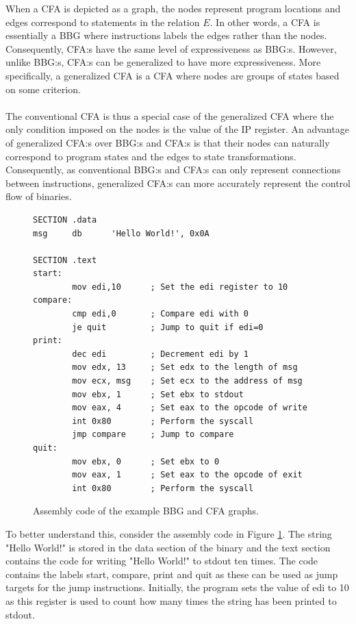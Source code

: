 \documentclass{kththesis}
\begin{document}
\clearpage
\noindent
When a CFA is depicted as a graph, the nodes represent program locations and edges correspond to statements in the relation $E$. In other words, a CFA is essentially a BBG where instructions labels the edges rather than the nodes. Consequently, CFA:s have the same level of expressiveness as BBG:s. However, unlike BBG:s, CFA:s can be generalized to have more expressiveness. More specifically, a generalized CFA is a CFA where nodes are groups of states based on some criterion. 
\\ \\
The conventional CFA is thus a special case of the generalized CFA where the only condition imposed on the nodes is the value of the IP register. An advantage of generalized CFA:s over BBG:s and CFA:s is that their nodes can naturally correspond to program states and the edges to state transformations. Consequently, as conventional BBG:s and CFA:s can only represent connections between instructions, generalized CFA:s can more accurately represent the control flow of binaries.
\begin{figure}[!t]
    \centering
\begin{tcolorbox}
\begin{verbatim}
SECTION .data
msg     db      'Hello World!', 0x0A

SECTION .text
start:
        mov edi,10      ; Set the edi register to 10
compare:
        cmp edi,0       ; Compare edi with 0
        je quit         ; Jump to quit if edi=0
print:
        dec edi         ; Decrement edi by 1
        mov edx, 13     ; Set edx to the length of msg
        mov ecx, msg    ; Set ecx to the address of msg
        mov ebx, 1      ; Set ebx to stdout
        mov eax, 4      ; Set eax to the opcode of write
        int 0x80        ; Perform the syscall
        jmp compare     ; Jump to compare
quit:
        mov ebx, 0      ; Set ebx to 0
        mov eax, 1      ; Set eax to the opcode of exit
        int 0x80        ; Perform the syscall
\end{verbatim}
\end{tcolorbox}
\caption[Assembly code of the example BBG and CFA graphs.]{Assembly code of the example BBG and CFA graphs.}
    \label{fig:assembly}
\end{figure}
\clearpage
\noindent
To better understand this, consider the assembly code in Figure \ref{fig:assembly}. The string "Hello World!" is stored in the data section of the binary and the text section contains the code for writing "Hello World!" to stdout ten times. The code contains the labels start, compare, print and quit as these can be used as jump targets for the jump instructions. Initially, the program sets the value of edi to 10 as this register is used to count how many times the string has been printed to stdout.
\end{document}
